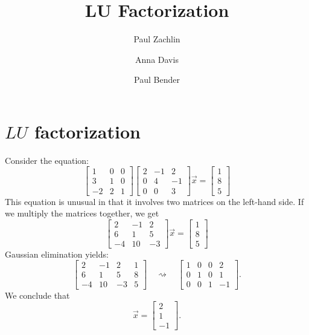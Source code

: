 \documentclass{ximera}
\author{Paul Zachlin \and Anna Davis \and Paul Bender} \title{LU Factorization} \license{CC-BY 4.0}
\begin{document}
\begin{abstract}
\end{abstract}
\maketitle
\section*{$LU$ factorization}

\begin{exploration}\label{init:LUfactorization}
Consider the equation:
$$\begin{bmatrix}1&0&0\\3&1&0\\-2&2&1\end{bmatrix}\begin{bmatrix}2&-1&2\\0&4&-1\\0&0&3\end{bmatrix}\vec{x}=\begin{bmatrix}1\\8\\5\end{bmatrix}$$
This equation is unusual in that it involves two matrices on the left-hand side.  If we multiply the matrices together, we get
$$\begin{bmatrix}2&-1&2\\6&1&5\\-4&10&-3\end{bmatrix}\vec{x}=\begin{bmatrix}1\\8\\5\end{bmatrix}$$
Gaussian elimination yields:
$$\begin{bmatrix}
2&-1&2&1\\6&1&5&8\\-4&10&-3&5
\end{bmatrix}
\quad\rightsquigarrow\quad
\begin{bmatrix}
 1&0&0&2\\0&1&0&1\\0&0&1&-1
\end{bmatrix}.
$$
We conclude that
$$\vec{x}=\begin{bmatrix}2\\1\\-1\end{bmatrix}.$$


\end{exploration}
\end{document}
